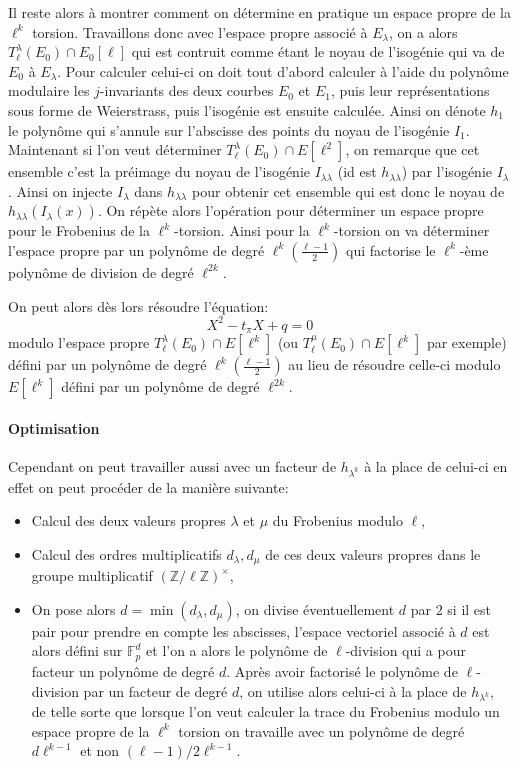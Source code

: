\documentclass[10pt,a4paper]{book}
\theoremstyle{plain}
\theoremstyle{definition}
\theoremstyle{definition}
\theoremstyle{definition}
\theoremstyle{definition}
\theoremstyle{remark}
\theoremstyle{remark}
\begin{document}
Il reste alors à montrer comment on détermine en pratique un espace propre de la $\ell^k$ torsion. Travaillons donc avec l'espace propre associé à $E_{\lambda}$, on a alors $T_{\ell}^{\lambda}(E_0) \cap E_0[\ell]$ qui est contruit comme étant le noyau de l'isogénie qui va de $E_0$ à $E_{\lambda}$. Pour calculer celui-ci on doit tout d'abord calculer à l'aide du polynôme modulaire les $j$-invariants des deux courbes $E_0$ et $E_1$, puis leur représentations sous forme de Weierstrass, puis l'isogénie est ensuite calculée. Ainsi on dénote $h_1$ le polynôme qui s'annule sur l'abscisse des points du noyau de l'isogénie $I_1$. 
Maintenant si l'on veut déterminer $T_{\ell}^{\lambda}(E_0) \cap E[\ell^2]$, on remarque que cet ensemble c'est la préimage du noyau de l'isogénie $I_{\lambda \lambda}$ (id est $h_{\lambda \lambda}$) par l'isogénie $I_{\lambda}$. Ainsi on injecte $I_{\lambda}$ dans $h_{\lambda \lambda}$ pour obtenir cet ensemble qui est donc le noyau de $h_{\lambda \lambda}(I_{\lambda}(x))$. On répète alors l'opération pour déterminer un espace propre pour le Frobenius de la $\ell^k$-torsion. Ainsi pour la $\ell^k$-torsion on va déterminer l'espace propre par un polynôme de degré $\ell^k  (\frac{\ell-1}{2})$ qui factorise le $\ell^k$-ème polynôme de division de degré $\ell^{2k}$.

On peut alors dès lors résoudre l'équation:
\begin{equation*}
X^2-t_{\pi}X+q=0
\end{equation*}
modulo l'espace propre $T_{\ell}^{\lambda}(E_0) \cap E[\ell^k]$ (ou $T_{\ell}^{\mu}(E_0) \cap E[\ell^k]$ par exemple) défini par un polynôme de degré $\ell^k  (\frac{\ell-1}{2})$ au lieu de résoudre celle-ci modulo $E[\ell^k]$ défini par un polynôme de degré $\ell^{2k}$.

\paragraph{Optimisation}
Cependant on peut travailler aussi avec un facteur de $h_{\lambda^k}$ à la place de celui-ci en effet on peut procéder de la manière suivante:
\begin{itemize}
\item Calcul des deux valeurs propres $\lambda$ et $\mu$ du Frobenius modulo $\ell$,
\item Calcul des ordres multiplicatifs $d_{\lambda},d_{\mu}$ de ces deux valeurs propres dans le groupe multiplicatif $(\mathbb{Z}/\ell \mathbb{Z})^{\times}$,
\item On pose alors $d=\min(d_{\lambda},d_{\mu})$, on divise éventuellement $d$ par $2$ si il est pair pour prendre en compte les abscisses, l'espace vectoriel associé à $d$ est alors défini sur $\mathbb{F}_p^{d}$ et l'on a alors le polynôme de $\ell$-division qui a pour facteur un polynôme de degré $d$. Après avoir factorisé le polynôme de $\ell$-division par un facteur de degré $d$, on utilise alors celui-ci à la place de $h_{\lambda^{k}}$, de telle sorte que lorsque l'on veut calculer la trace du Frobenius modulo un espace propre de la $\ell^k$ torsion on travaille avec un polynôme de degré $d \ell^{k-1}$ et non $(\ell -1)/2 \ell^{k-1}$.
\end{itemize}
\end{document}

